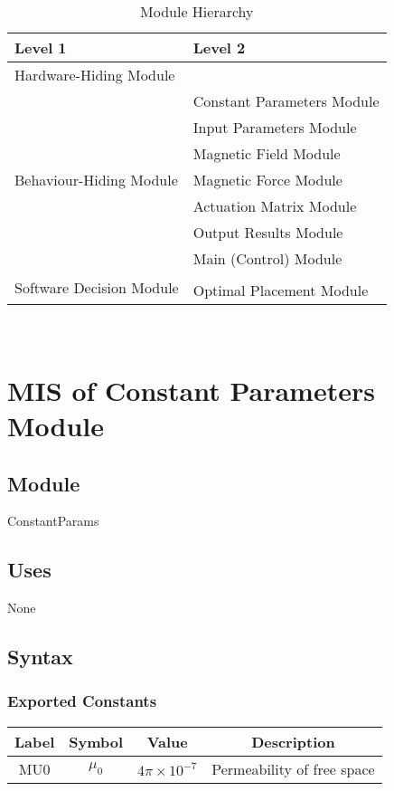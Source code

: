 \documentclass[12pt, titlepage]{article}
\begin{document}
\begin{table}[h!]
\centering
\begin{tabular}{p{} p{}}
\toprule
\textbf{Level 1} & \textbf{Level 2}\\
\midrule

{Hardware-Hiding Module} & ~ \\
\midrule

\multirow{7}{0.3\textwidth}{Behaviour-Hiding Module} & Constant Parameters Module\\
& Input Parameters Module\\
& Magnetic Field Module\\
& Magnetic Force Module\\
& Actuation Matrix Module\\
& Output Results Module\\ 
& Main (Control) Module\\
\midrule

\multirow{3}{0.3\textwidth}{Software Decision Module} & \\
& Optimal Placement Module\\
\bottomrule

\end{tabular}
\caption{Module Hierarchy}
\label{TblMH}
\end{table}

\newpage
~\newpage

\section{MIS of Constant Parameters Module} \label{MISConsParam}
\subsection{Module}
ConstantParams

\subsection{Uses}
None

\subsection{Syntax}
\subsubsection{Exported Constants}
\begin{center}
\begin{tabular}{ c | c | c | c }
  Label & Symbol & Value & Description \\
  \hline
  MU0 & $\mu_0$ & $4\pi \times 10^{-7}$ & Permeability of free space
\end{tabular}
\end{center}
\end{document}
